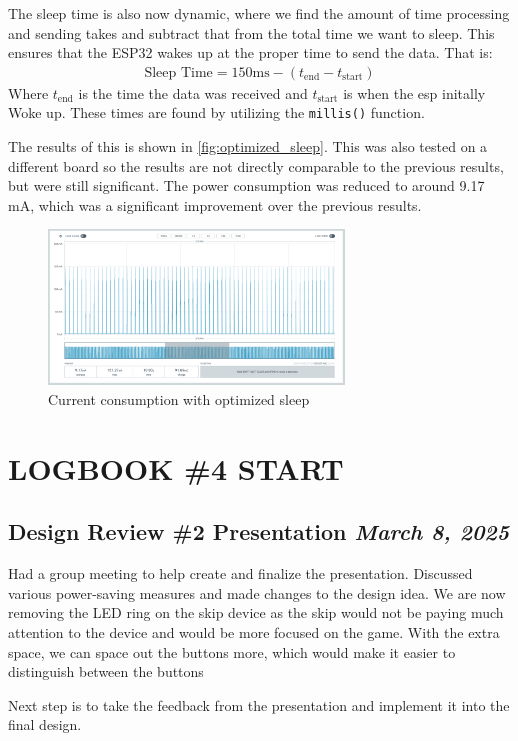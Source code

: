 \documentclass{article}
\newcommand{\logbookentry}[2]{
    \subsection*{#1 \hfill \textit{#2}} 
}
\begin{document}
The sleep time is also now dynamic, where we find the amount of time processing and sending takes and subtract that from the total time we want to sleep. This ensures that the ESP32 wakes up at the proper time to send the data. That is:
\begin{align*}
    \text{Sleep Time} = 150\text{ms} - (t_{\text{end}} - t_{\text{start}})
\end{align*}
Where $t_{\text{end}}$ is the time the data was received and $t_{\text{start}}$ is when the esp initally Woke up. These times are found by utilizing the \texttt{millis()} function.

The results of this is shown in \autoref{fig:optimized_sleep}. This was also tested on a different board so the results are not directly comparable to the previous results, but were still significant. The power consumption was reduced to around 9.17 mA, which was a significant improvement over the previous results.
\begin{figure}[ht!]
    \centering
    \includegraphics[width=0.70\textwidth]{4th benchmark.png}
    \caption{Current consumption with optimized sleep}
    \label{fig:optimized_sleep}
\end{figure}

\newpage
\section{LOGBOOK \#4 START}

\logbookentry{Design Review \#2 Presentation}{March 8, 2025}
Had a group meeting to help create and finalize the presentation. Discussed various power-saving measures and made changes to the design idea. We are now removing the LED ring on the skip device as the skip would not be paying much attention to the device and would be more focused on the game. With the extra space, we can space out the buttons more, which would make it easier to distinguish between the buttons

Next step is to take the feedback from the presentation and implement it into the final design.
\end{document}
